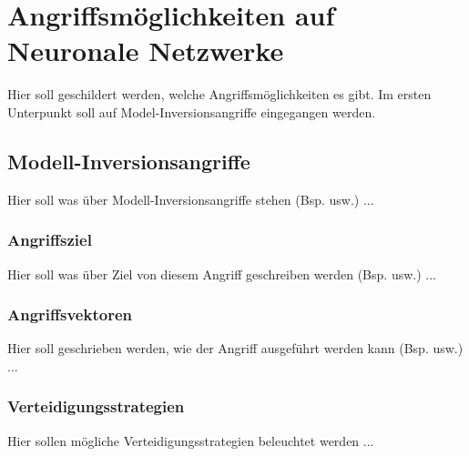 \section{Angriffsmöglichkeiten auf Neuronale Netzwerke} \label{chpt:Stand_der_Technik_Angriffe}
Hier soll geschildert werden, welche Angriffsmöglichkeiten es gibt. Im ersten Unterpunkt soll auf Model-Inversionsangriffe eingegangen werden.
\subsection{Modell-Inversionsangriffe}
Hier soll was über Modell-Inversionsangriffe stehen (Bsp. usw.) ...
\subsubsection{Angriffsziel}
Hier soll was über Ziel von diesem Angriff geschreiben werden (Bsp. usw.) ...
\subsubsection{Angriffsvektoren}
Hier soll geschrieben werden, wie der Angriff ausgeführt werden kann (Bsp. usw.) ...
\subsubsection{Verteidigungsstrategien}
Hier sollen mögliche Verteidigungsstrategien beleuchtet werden ...
